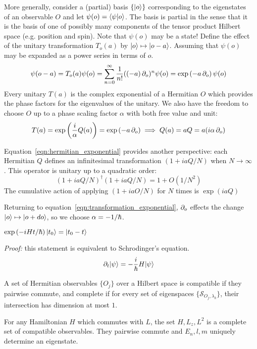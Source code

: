 More generally, consider a (partial) basis $\{|o\rangle\}$ corresponding to the eigenstates of an observable $O$ 
and let $\psi(o)=\langle \psi|o\rangle$. The basis is partial in the sense that it is the basis of 
one of possibly many components of the tensor product Hilbert space (e.g. position and spin). 
Note that $\psi(o)$ may be a state!
Define the effect of the unitary transformation $T_o(a)$ by $|o\rangle \mapsto |o-a\rangle$. 
Assuming that $\psi(o)$ may be expanded as a power series in terms of $o$. 
\begin{equation}
    \psi(o-a)=T_o(a)\psi(o)=\sum_{n=0}^\infty \dfrac 1 {n!} ((-a)\, \partial_{o})^n \psi(o)
    =\exp\left(-a\,\partial_{o}\right)\psi(o)
\end{equation}
Every unitary $T(a)$ is the complex exponential of a Hermitian $O$ which provides the 
phase factors for the eigenvalues of the unitary. We also have the freedom to choose $O$ 
up to a phase scaling factor $\alpha$ with both free value and unit: 
\begin{equation}\label{eqn:transformation_exponential}
    T(a)=\exp\left(\dfrac i \alpha Q(a)\right)=\exp\left(-a\, \partial_{o}\right)\implies Q(a) 
    = a Q = a (i\alpha \, \partial_{o})
\end{equation}

\begin{remark}
    Equation~\ref{eqn:hermitian_exponential} provides another perspective: 
    each Hermitian $Q$ defines an infinitesimal transformation $\left(1 + ia Q/N\right)$ when $N\to \infty$. 
    This operator is unitary up to a quadratic order:
    \begin{equation}\label{eqn:hermitian_exponential}
        \left(1 + ia Q/N\right)^\dag \left(1 + ia Q/N\right)
        =1+O(1/N^2)
    \end{equation}
    The cumulative action of applying $\left(1 + ia O/N\right)$ for $N$ times is $\exp(ia Q)$
\end{remark}
Returning to equation~\ref{eqn:transformation_exponential}, 
$\partial_{o}$ effects the change $|o\rangle\mapsto |o+do\rangle$, so we choose $\alpha = -1/\hbar$.
\begin{theorem} $\exp\left(-i H t/\hbar\right)|t_0\rangle = |t_0-t\rangle$

    \textit{Proof:} this statement is equivalent to Schrodinger's equation. 
    \[ 
        \partial_{t}|\psi\rangle = -\dfrac i {\hbar} H|\psi\rangle
    \] 
\end{theorem}

\begin{definition}
    \label{def:csco}
    A set of Hermitian observables $\{O_j\}$ over a Hilbert space is 
    compatible if they pairwise commute, and complete if for every 
    set of eigenspaces $\{\mathcal S_{O_j, \lambda_k}\}$, their intersection 
    has dimension at most $1$. 
\end{definition}
\begin{example}
    For any Hamiltonian $H$ which commutes with $L$, the set $H, L_z, L^2$ is 
    a complete set of compatible observables. 
    They pairwise commute and $E_n, l, m$ uniquely determine an eigenstate. 
\end{example}



